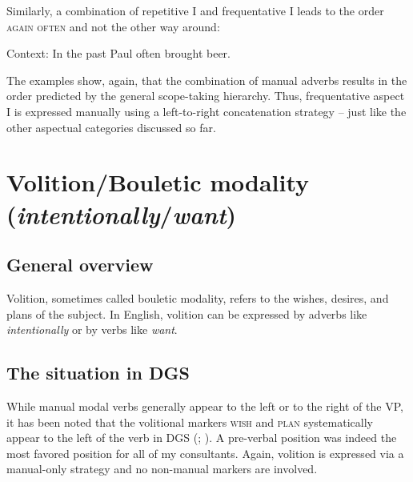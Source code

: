 \noindent Similarly, a combination of repetitive I and frequentative I leads to the order \textsc{again often} and not the other way around: 

\begin{exe}
\ex Context: In the past Paul often brought beer. \label{combininghabitualandfrequentative}\begin{xlist} 
\end{xlist}
\end{exe} 

\noindent The examples show, again, that the combination of manual adverbs results in the order predicted by the general scope-taking hierarchy. Thus, frequentative aspect I is expressed manually using a left-to-right concatenation strategy -- just like the other aspectual categories discussed so far.




\section{Volition/Bouletic modality (\textit{intentionally}/\textit{want})}\label{volition}
\subsection{General overview}
Volition, sometimes called bouletic modality, refers to the wishes, desires, and plans of the subject. In English, volition can be expressed by adverbs like \textit{intentionally} or by verbs like \textit{want}.

\subsection{The situation in DGS}


While manual modal verbs generally appear to the left or to the right of the VP, it has been noted that the volitional markers \textsc{wish} and \textsc{plan} systematically appear to the left of the verb in DGS (\citealt[326]{happ2014vork}; \citealt[20]{bross2017scope}). A pre-verbal position was indeed the most favored position for all of my consultants. Again, volition is expressed via a manual-only strategy and no non-manual markers are involved. 

